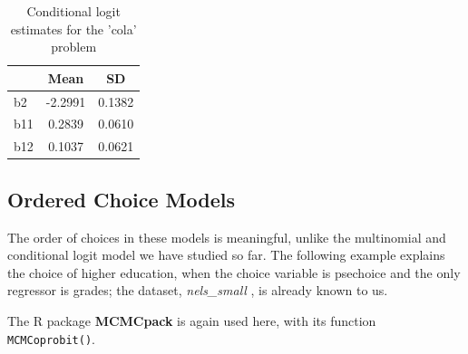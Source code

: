 \documentclass[]{book}
\newenvironment{Shaded}{\begin{snugshade}}{\end{snugshade}}
\newcommand{\DataTypeTok}[1]{\textcolor[rgb]{0.13,0.29,0.53}{#1}}
\newcommand{\DecValTok}[1]{\textcolor[rgb]{0.00,0.00,0.81}{#1}}
\newcommand{\KeywordTok}[1]{\textcolor[rgb]{0.13,0.29,0.53}{\textbf{#1}}}
\newcommand{\NormalTok}[1]{#1}
\newcommand{\OperatorTok}[1]{\textcolor[rgb]{0.81,0.36,0.00}{\textbf{#1}}}
\newcommand{\StringTok}[1]{\textcolor[rgb]{0.31,0.60,0.02}{#1}}
\begin{document}
\begin{Shaded}
\end{Shaded}

\begin{table}

\caption{\label{tab:unnamed-chunk-137}Conditional logit estimates for the 'cola' problem}
\centering
\begin{tabular}[t]{l|c|c}
\hline
  & Mean & SD\\
\hline
b2 & -2.2991 & 0.1382\\
\hline
b11 & 0.2839 & 0.0610\\
\hline
b12 & 0.1037 & 0.0621\\
\hline
\end{tabular}
\end{table}

\hypertarget{ordered-choice-models}{%
\subsection{Ordered Choice Models}\label{ordered-choice-models}}

The order of choices in these models is meaningful, unlike the
multinomial and conditional logit model we have studied so far. The
following example explains the choice of higher education, when the
choice variable is psechoice and the only regressor is grades; the
dataset, \emph{nels\_small} , is already known to us.

The R package \textbf{MCMCpack} is again used here, with its function
\texttt{MCMCoprobit()}.
\end{document}
